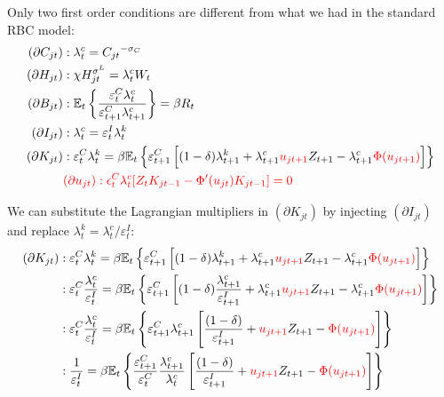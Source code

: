 \documentclass{article}%
\begin{document}
Only two first order conditions are different from what we had in the standard
RBC model:%
\begin{align*}
\left(  \partial C_{jt}\right)   &  :\lambda_{t}^{c}=C_{jt}{}^{-\sigma_{C}}\\
\left(  \partial H_{jt}\right)   &  :\chi H_{jt}^{\sigma^{L}}=\lambda_{t}%
^{c}W_{t}\\
\left(  \partial B_{jt}\right)   &  :\mathbb{E}_{t}\left\{  \frac
{\varepsilon_{t}^{C}\lambda_{t}^{c}}{\varepsilon_{t+1}^{C}\lambda_{t+1}^{c}%
}\right\}  =\beta R_{t}\\
\left(  \partial I_{jt}\right)   &  :\lambda_{t}^{c}=\varepsilon_{t}%
^{I}\lambda_{t}^{k}\\
\left(  \partial K_{jt}\right)   &  :\varepsilon_{t}^{C}\lambda_{t}^{k}%
=\beta\mathbb{E}_{t}\left\{  \varepsilon_{t+1}^{C}\left[  \overset{}{\left(
1-\delta\right)  }\lambda_{t+1}^{k}+\lambda_{t+1}^{c}%
\textcolor{red}{u_{jt+1}}Z_{t+1}-\lambda_{t+1}^{c}%
\textcolor{red}{\Phi(u_{jt+1})}\right]  \right\}  \\
&
\textcolor{red}{(\partial u_{jt}):\epsilon_{t}^{C}\lambda_{t}^{c}[Z_{t}K_{jt-1}-\Phi'(u_{jt})K_{jt-1}]=0}
\end{align*}


We can substitute the Lagrangian multipliers in $\left(  \partial
K_{jt}\right)  $ by injecting $\left(  \partial I_{jt}\right)  $ and replace
$\lambda_{t}^{k}=\lambda_{t}^{c}/\varepsilon_{t}^{I}$:\
\begin{align*}
\left(  \partial K_{jt}\right)   &  :\varepsilon_{t}^{C}\lambda_{t}^{k}%
=\beta\mathbb{E}_{t}\left\{  \varepsilon_{t+1}^{C}\left[  \overset{}{\left(
1-\delta\right)  }\lambda_{t+1}^{k}+\lambda_{t+1}^{c}%
\textcolor{red}{u_{jt+1}}Z_{t+1}-\lambda_{t+1}^{c}%
\textcolor{red}{\Phi(u_{jt+1})}\right]  \right\} \\
&  :\varepsilon_{t}^{C}\frac{\lambda_{t}^{c}}{\varepsilon_{t}^{I}}%
=\beta\mathbb{E}_{t}\left\{  \varepsilon_{t+1}^{C}\left[  \overset{}{\left(
1-\delta\right)  }\frac{\lambda_{t+1}^{c}}{\varepsilon_{t+1}^{I}}%
+\lambda_{t+1}^{c}\textcolor{red}{u_{jt+1}}Z_{t+1}-\lambda_{t+1}%
^{c}\textcolor{red}{\Phi(u_{jt+1})}\right]  \right\} \\
&  :\varepsilon_{t}^{C}\frac{\lambda_{t}^{c}}{\varepsilon_{t}^{I}}%
=\beta\mathbb{E}_{t}\left\{  \varepsilon_{t+1}^{C}\lambda_{t+1}^{c}\left[
\frac{\overset{}{\left(  1-\delta\right)  }}{\varepsilon_{t+1}^{I}%
}+\textcolor{red}{u_{jt+1}}Z_{t+1}-\textcolor{red}{\Phi(u_{jt+1})}\right]
\right\} \\
&  :\frac{1}{\varepsilon_{t}^{I}}=\beta\mathbb{E}_{t}\left\{  \frac
{\varepsilon_{t+1}^{C}}{\varepsilon_{t}^{C}}\frac{\lambda_{t+1}^{c}}%
{\lambda_{t}^{c}}\left[  \frac{\overset{}{\left(  1-\delta\right)  }%
}{\varepsilon_{t+1}^{I}}+\textcolor{red}{u_{jt+1}}Z_{t+1}%
-\textcolor{red}{\Phi(u_{jt+1})}\right]  \right\}
\end{align*}
\end{document}
